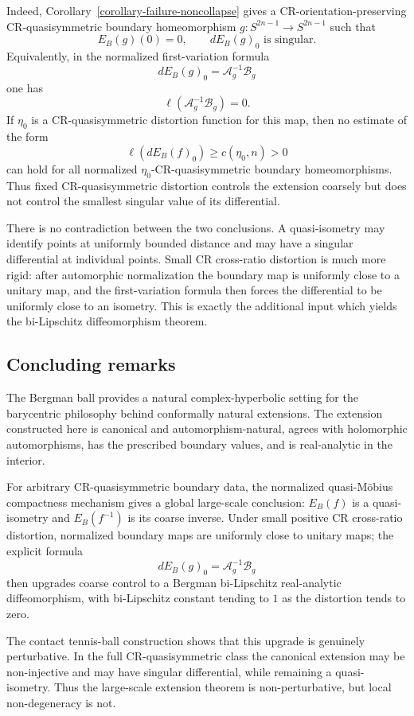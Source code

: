 \documentclass[11pt]{article}
\theoremstyle{definition}
\theoremstyle{remark}
\theoremstyle{definition}
\begin{document}
Indeed, Corollary~\ref{corollary-failure-noncollapse} gives a
CR-orientation-preserving CR-quasisymmetric boundary homeomorphism
\(g:S^{2n-1}\to S^{2n-1}\) such that
\[
        E_B(g)(0)=0,
        \qquad dE_B(g)_0\text{ is singular}.
\]
Equivalently, in the normalized first-variation formula
\[
        dE_B(g)_0=\mathcal A_g^{-1}\mathcal B_g
\]
one has
\[
        \ell(\mathcal A_g^{-1}\mathcal B_g)=0.
\]
If \(\eta_0\) is a CR-quasisymmetric distortion function for this map, then no
estimate of the form
\[
        \ell(dE_B(f)_0)\ge c(\eta_0,n)>0
\]
can hold for all normalized \(\eta_0\)-CR-quasisymmetric boundary
homeomorphisms.  Thus fixed CR-quasisymmetric distortion controls the extension
coarsely but does not control the smallest singular value of its differential.

There is no contradiction between the two conclusions.  A quasi-isometry may
identify points at uniformly bounded distance and may have a singular
differential at individual points.  Small CR cross-ratio distortion is much
more rigid: after automorphic normalization the boundary map is uniformly close
to a unitary map, and the first-variation formula then forces the differential
to be uniformly close to an isometry.  This is exactly the additional input
which yields the bi-Lipschitz diffeomorphism theorem.


\subsection*{Concluding remarks}

The Bergman ball provides a natural complex-hyperbolic setting for the
barycentric philosophy behind conformally natural extensions.  The extension
constructed here is canonical and automorphism-natural, agrees with
holomorphic automorphisms, has the prescribed boundary values, and is
real-analytic in the interior.

For arbitrary CR-quasisymmetric boundary data, the normalized quasi-M\"obius
compactness mechanism gives a global large-scale conclusion: \(E_B(f)\) is a
quasi-isometry and \(E_B(f^{-1})\) is its coarse inverse.  Under small positive
CR cross-ratio distortion, normalized boundary maps are uniformly close to
unitary maps; the explicit formula
\[
        dE_B(g)_0=\mathcal A_g^{-1}\mathcal B_g
\]
then upgrades coarse control to a Bergman bi-Lipschitz real-analytic
diffeomorphism, with bi-Lipschitz constant tending to \(1\) as the distortion
tends to zero.

The contact tennis-ball construction shows that this upgrade is genuinely
perturbative.  In the full CR-quasisymmetric class the canonical extension may
be non-injective and may have singular differential, while remaining a
quasi-isometry.  Thus the large-scale extension theorem is non-perturbative,
but local non-degeneracy is not.
\end{document}
